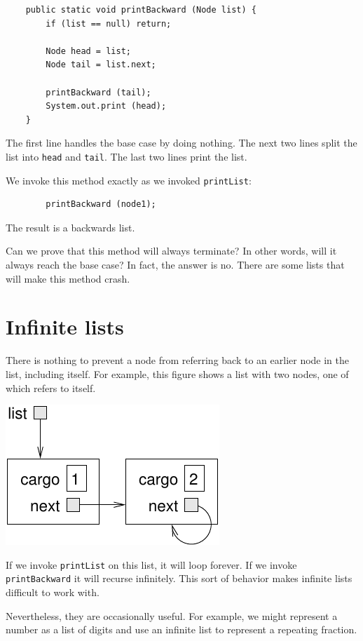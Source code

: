 \documentclass[12pt]{book}
\theoremstyle{exercise}
\begin{document}
\begin{verbatim}
    public static void printBackward (Node list) {
        if (list == null) return;

        Node head = list;
        Node tail = list.next;

        printBackward (tail);
        System.out.print (head);
    }    
\end{verbatim}
%
The first line handles the base case by doing nothing.  The
next two lines split the list into {\tt head} and {\tt tail}.
The last two lines print the list.

We invoke this method exactly as we invoked {\tt printList}:

\begin{verbatim}
        printBackward (node1);
\end{verbatim}
%
The result is a backwards list.

Can we prove that this method will always terminate?   In other
words, will it always reach the base case?  In fact, the answer
is no.  There are some lists that will make this method crash.


\section{Infinite lists}

There is nothing to prevent a node from referring back to
an earlier node in the list, including itself.  For example,
this figure shows a list with two nodes, one of which refers
to itself.

\includegraphics{figs/list4.pdf}

If we invoke {\tt printList} on this list, it will loop forever.
If we invoke {\tt printBackward} it will recurse infinitely.
This sort of behavior makes infinite lists difficult to work
with.

Nevertheless, they are occasionally useful.  For example, we
might represent a number as a list of digits and use an infinite
list to represent a repeating fraction.
\end{document}
